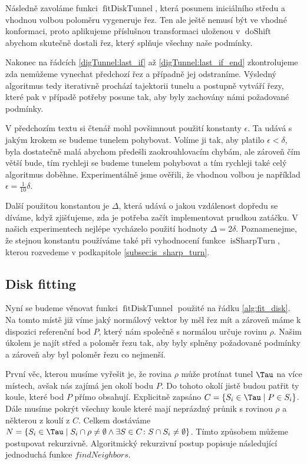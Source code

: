 Následně zavoláme funkci $ \operatorname{fitDiskTunnel} $, která posunem iniciálního
středu a vhodnou volbou poloměru vygeneruje řez. Ten ale ještě nemusí být ve vhodné
konformaci, proto aplikujeme příslušnou transformaci uloženou v $ \operatorname{doShift} $
abychom skutečně dostali řez, který splňuje všechny naše podmínky.

Nakonec na řádcích \ref{digTunnel:last_if} až \ref{digTunnel:last_if_end}
zkontrolujeme zda nemůžeme vynechat předchozí řez a případně jej odstraníme.
Výsledný algoritmus tedy iterativně prochází tajektorii tunelu a postupně vytváří řezy,
které pak v případě potřeby posune tak, aby byly zachovány námi požadované podmínky.

V předchozím textu si čtenář mohl povšimnout použití konstanty $ \epsilon $.
Ta udává s jakým krokem se budeme tunelem pohybovat.
Volíme ji tak, aby platilo  $ \epsilon < \delta $, byla dostatečně malá abychom
předešli zaokrouhlovacím chybám, ale zároveň čím větší bude, tím rychleji se
budeme tunelem pohybovat a tím rychleji také celý algoritmus doběhne. Experimentálně
jsme ověřili, že vhodnou volbou je například $ \epsilon = \frac{1}{10} \delta $.

Další použitou konstantou je $ \Delta $, která udává o jakou vzdálenost dopředu
se díváme, když zjišťujeme, zda je potřeba začít implementovat prudkou zatáčku.
V našich experimentech nejlépe vycházelo použití hodnoty $ \Delta = 2 \delta $.
Poznamenejme, že stejnou konstantu používáme také při vyhodnocení funkce
$ \operatorname{isSharpTurn} $, kterou rozvedeme v podkapitole \ref{subsec:is_sharp_turn}.




\subsection{Disk fitting} \label{subsec:disk_fit}
Nyní se budeme věnovat funkci $ \operatorname{fitDiskTunnel} $ použité na řádku
\ref{alg:fit_disk}. Na tomto místě již víme jaký normálový vektor by měl řez mít a
zároveň máme k dispozici referenční bod $ P $, který nám společně s normálou
určuje rovinu $ \rho $. Našim úkolem je najít střed a poloměr řezu tak, aby
byly splněny požadované podmínky a zároveň aby byl poloměr řezu co nejmenší.

První věc, kterou musíme vyřešit je, že rovina $ \rho $ může protínat tunel $ \Tau $
na více místech, avšak nás zajímá jen okolí bodu $ P $. Do tohoto okolí jistě
budou patřit ty koule, které bod $ P $ přímo obsahují. Explicitně
zapsáno $ C = \{S_i \in \Tau \mid P \in S_i \} $. Dále musíme pokrýt všechny
koule které mají neprázdný průnik s rovinou $ \rho $ a některou z koulí z $ C $.
Celkem dostáváme
$ N = \{ S_i \in \Tau \mid S_i \cap \rho \neq \emptyset \wedge \exists S \in C \colon S \cap S_i \neq \emptyset  \}$.
Tímto způsobem můžeme postupovat rekurzivně. Algoritmický rekurzivní postup
popisuje následující jednoduchá funkce $ findNeighbors $.

